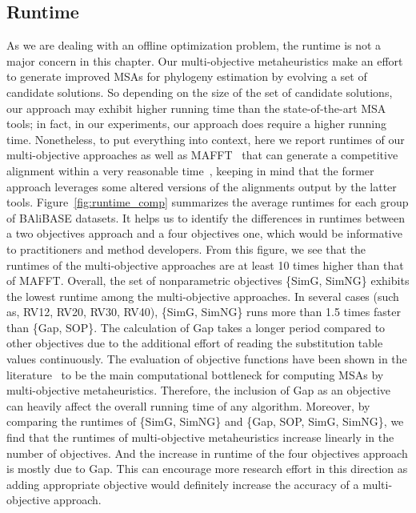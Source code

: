 \subsection{Runtime}\label{sec:run}
As we are dealing with an offline optimization problem, the runtime is not a major concern in this chapter. Our multi-objective metaheuristics make an effort to generate improved MSAs for phylogeny estimation by evolving a set of candidate solutions. So depending on the size of the set of candidate solutions, our approach may exhibit higher running time than the state-of-the-art MSA tools; in fact, in our experiments, our approach does require a higher running time. Nonetheless, to put everything into context, here we report runtimes of our multi-objective approaches as well as MAFFT~\citep{katoh2002mafft} that can generate a competitive alignment within a very reasonable time~\citep{ashkenazy2018multiple}, keeping in mind that the former approach leverages some altered versions of the alignments output by the latter tools. Figure~\ref{fig:runtime_comp} summarizes the average runtimes for each group of BAliBASE datasets. It helps us to identify the differences in runtimes between a two objectives approach and a four objectives one, which would be informative to practitioners and method developers. From this figure, we see that the runtimes of the multi-objective approaches are at least 10 times higher than that of MAFFT. Overall, the set of nonparametric objectives \{SimG, SimNG\} exhibits the lowest runtime among the multi-objective approaches. In several cases (such as, RV12, RV20, RV30, RV40), \{SimG, SimNG\} runs more than 1.5 times faster than \{Gap, SOP\}. The calculation of Gap takes a longer period compared to other objectives due to the additional effort of reading the substitution table values continuously. The evaluation of objective functions have been shown in the literature~\citep{zambrano2017m2align} to be the main computational bottleneck for computing MSAs by multi-objective metaheuristics. Therefore, the inclusion of Gap as an objective can heavily affect the overall running time of any algorithm. Moreover, by comparing the runtimes of \{SimG, SimNG\} and \{Gap, SOP, SimG, SimNG\}, we find that the runtimes of multi-objective metaheuristics increase linearly in the number of objectives. And the increase in runtime of the four objectives approach is mostly due to Gap. This can encourage more research effort in this direction as adding appropriate objective would definitely increase the accuracy of a multi-objective approach.

